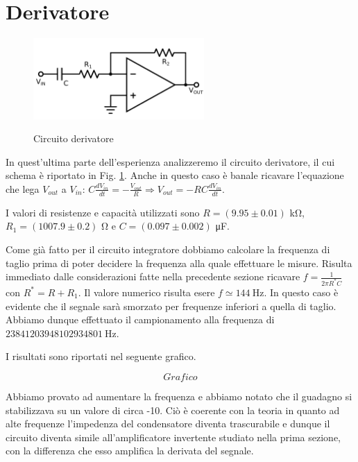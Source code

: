\section{Derivatore}

\begin{figure}
	\caption{Circuito derivatore}
	\includegraphics[width=65mm]{ccder.pdf}
	\label{fig:ccder}
\end{figure}

In quest'ultima parte dell'esperienza analizzeremo il circuito derivatore, il cui schema è riportato in Fig. \ref{fig:ccder}.
Anche in questo caso è banale ricavare l'equazione che lega $V_{out}$ a $V_{in}$: $C\frac{dV_{in}}{dt}=-\frac{V_{out}}{R}\Rightarrow V_{out}=-RC\frac{dV_{in}}{dt}$.

I valori di resistenze e capacità utilizzati sono $R=(9.95 \pm 0.01)$ \si{\kilo\ohm}, $R_1=(1007.9 \pm 0.2)$ \si{\ohm} e $C=(0.097 \pm 0.002)$ \si{\micro\farad}.

Come già fatto per il circuito integratore dobbiamo calcolare la frequenza di taglio prima di poter decidere la frequenza alla quale effettuare le misure.
Risulta immediato dalle considerazioni fatte nella precedente sezione ricavare $f=\frac{1}{2 \pi R^* C}$ con $R^*=R+R_1$.
Il valore numerico risulta esere $f \simeq \SI{144}{\hertz}$.
In questo caso è evidente che il segnale sarà smorzato per frequenze inferiori a quella di taglio. Abbiamo dunque effettuato il campionamento alla frequenza di $\SI{23841203948102934801}{\hertz}$.

I risultati sono riportati nel seguente grafico.

$$Grafico$$

Abbiamo provato ad aumentare la frequenza e abbiamo notato che il guadagno si stabilizzava su un valore di circa -10.
Ciò è coerente con la teoria in quanto ad alte frequenze l'impedenza del condensatore diventa trascurabile e dunque il circuito diventa simile all'amplificatore invertente studiato nella prima sezione, con la differenza che esso amplifica la derivata del segnale.